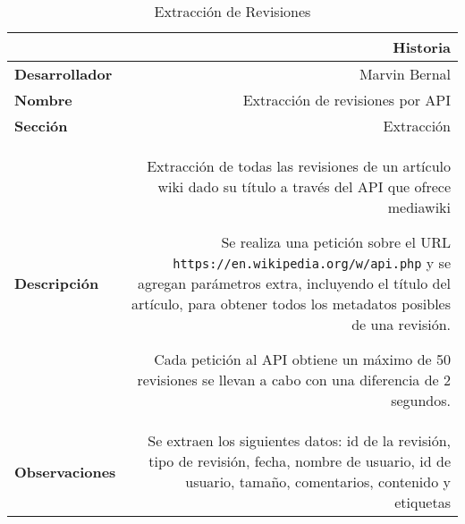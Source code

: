 
\renewcommand{\arraystretch}{1.5}
\begin{table}[H]
	\begin{center}
		\begin{tabular}{|l|r|}
			\hline
			\multicolumn{2}{|r|}{\textbf{Historia}} \\
			\hline
			\textbf{Desarrollador} & Marvin Bernal\\
			\hline
			\textbf{Nombre} & Extracción de revisiones por API\\
			\hline
			\textbf{Sección} & Extracción\\
			\hline
			\textbf{Descripción} & \parbox[t]{3in}{Extracción de todas las revisiones de un artículo
				wiki dado su título a través del API que ofrece mediawiki \par
				Se realiza una petición sobre el URL
				\texttt{https://en.wikipedia.org/w/api.php} y se agregan parámetros
				extra, incluyendo el título del artículo, para obtener todos los
				metadatos posibles de una revisión.
				\par
				Cada petición al API obtiene un máximo de 50 revisiones se llevan
				a cabo con una diferencia de 2 segundos.}\\
			\hline
			\textbf{Observaciones} & \parbox[t]{3in}{Se extraen los siguientes datos: id de la revisión, tipo de revisión,
			fecha, nombre de usuario, id de usuario, tamaño, comentarios,
			contenido y etiquetas}\\
			\hline
		\end{tabular}
		\caption{Extracción de Revisiones}
		\label{tab:extract_revisions}
	\end{center}
\end{table}
